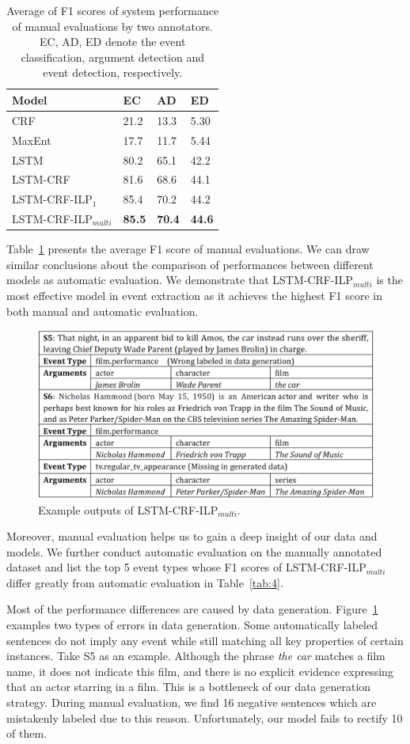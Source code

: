 \begin{table}[h]
\small
\centering
\begin{tabular}{|l|p{0.8cm}<{\centering}|p{0.8cm}<{\centering}|p{0.8cm}<{\centering}|} \hline
	Model & EC & AD & ED \\ \hline
	CRF & 21.2 & 13.3 & 5.30 \\ \hline
	MaxEnt & 17.7 & 11.7 & 5.44 \\ \hline
	LSTM & 80.2 & 65.1 & 42.2 \\ \hline \hline
	LSTM-CRF & 81.6 & 68.6 & 44.1 \\ \hline
	LSTM-CRF-ILP$_{1}$ & 85.4 & 70.2 & 44.2 \\ \hline
	LSTM-CRF-ILP$_{multi}$ & \textbf{85.5} & \textbf{70.4} & \textbf{44.6} \\ \hline
\end{tabular}
\caption{Average of F1 scores of system performance of manual evaluations by two annotators. EC, AD, ED denote the event classification, argument detection and event detection, respectively. \label{tab:2}}
\end{table}

Table~\ref{tab:2} presents the average F1 score of manual evaluations. We can draw similar conclusions about the comparison of performances between different models as automatic evaluation. We demonstrate that LSTM-CRF-ILP$_{multi}$ is the most effective model in event extraction as it achieves the highest F1 score in both manual and automatic evaluation.

\begin{figure}[h]
	\centering
	\includegraphics[width=.48\textwidth]{example.png}
	\caption{Example outputs of LSTM-CRF-ILP$_{multi}$.\label{fig:1}}
\end{figure}

Moreover, manual evaluation helps us to gain a deep insight of our data and models. We further conduct automatic evaluation on the manually annotated dataset and list the top 5 event types whose F1 scores of LSTM-CRF-ILP$_{multi}$ differ greatly from automatic evaluation in Table~\ref{tab:4}.

Most of the performance differences are caused by data generation. Figure~\ref{fig:1} examples two types of errors in data generation. Some automatically labeled sentences do not imply any event while still matching all key properties of certain instances. Take S5 as an example. Although the phrase \emph{the car} matches a film name, it does not indicate this film, and there is no explicit evidence expressing that an actor starring in a film. This is a bottleneck of our data generation strategy. During manual evaluation, we find 16 negative sentences which are mistakenly labeled due to this reason. Unfortunately, our model fails to rectify 10 of them.

